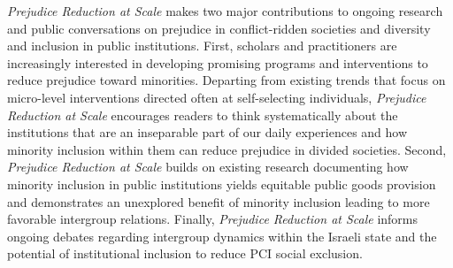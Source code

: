 \documentclass[12pt]{article}
\theoremstyle{plain}
\begin{document}
\emph{Prejudice Reduction at Scale} makes two major contributions to ongoing research and public conversations on prejudice in conflict-ridden societies and diversity and inclusion in public institutions. First, scholars and practitioners are increasingly interested in developing promising programs and interventions to reduce prejudice toward minorities. Departing from existing trends that focus on micro-level interventions directed often at self-selecting individuals, \emph{Prejudice Reduction at Scale} encourages readers to think systematically about the institutions that are an inseparable part of our daily experiences and how minority inclusion within them can reduce prejudice in divided societies. Second, \emph{Prejudice Reduction at Scale} builds on existing research documenting how minority inclusion in public institutions yields equitable public goods provision and demonstrates an unexplored benefit of minority inclusion leading to more favorable intergroup relations. Finally, \emph{Prejudice Reduction at Scale} informs ongoing debates regarding intergroup dynamics within the Israeli state and the potential of institutional inclusion to reduce PCI social exclusion.
\end{document}
